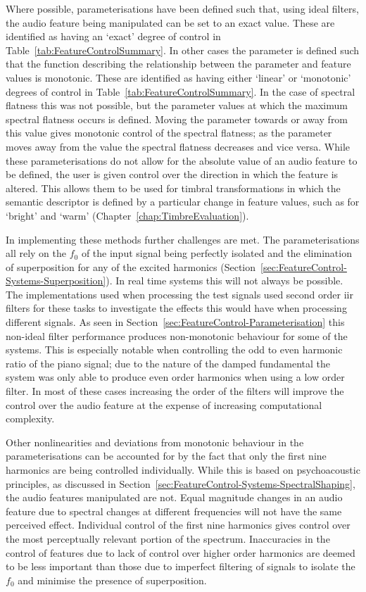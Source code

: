 	Where possible, parameterisations have been defined such that, using ideal filters, the audio feature being
	manipulated can be set to an exact value. These are identified as having an `exact' degree of control in
	Table~\ref{tab:FeatureControlSummary}. In other cases the parameter is defined such that the function describing
	the relationship between the parameter and feature values is monotonic. These are identified as having either
	`linear' or `monotonic' degrees of control in Table~\ref{tab:FeatureControlSummary}. In the case of spectral
	flatness this was not possible, but the parameter values at which the maximum spectral flatness occurs is defined.
	Moving the parameter towards or away from this value gives monotonic control of the spectral flatness; as the
	parameter moves away from the value the spectral flatness decreases and vice versa. While these parameterisations
	do not allow for the absolute value of an audio feature to be defined, the user is given control over the direction
	in which the feature is altered. This allows them to be used for timbral transformations in which the semantic
	descriptor is defined by a particular change in feature values, such as for `bright' and `warm'
	(Chapter~\ref{chap:TimbreEvaluation}).

	In implementing these methods further challenges are met. The parameterisations all rely on the $f_{0}$ of the
	input signal being perfectly isolated and the elimination of superposition for any of the excited harmonics
	(Section~\ref{sec:FeatureControl-Systems-Superposition}). In real time systems this will not always be possible.
	The implementations used when processing the test signals used second order \acrshort{iir} filters for these tasks
	to investigate the effects this would have when processing different signals. As seen in
	Section~\ref{sec:FeatureControl-Parameterisation} this non-ideal filter performance produces non-monotonic
	behaviour for some of the systems. This is especially notable when controlling the odd to even harmonic ratio of
	the piano signal; due to the nature of the damped fundamental the system was only able to produce even order
	harmonics when using a low order filter. In most of these cases increasing the order of the filters will improve
	the control over the audio feature at the expense of increasing computational complexity.

	Other nonlinearities and deviations from monotonic behaviour in the parameterisations can be accounted for by the
	fact that only the first nine harmonics are being controlled individually. While this is based on psychoacoustic
	principles, as discussed in Section~\ref{sec:FeatureControl-Systems-SpectralShaping}, the audio features
	manipulated are not. Equal magnitude changes in an audio feature due to spectral changes at different frequencies
	will not have the same perceived effect. Individual control of the first nine harmonics gives control over the most
	perceptually relevant portion of the spectrum. Inaccuracies in the control of features due to lack of control over
	higher order harmonics are deemed to be less important than those due to imperfect filtering of signals to isolate
	the $f_{0}$ and minimise the presence of superposition.

